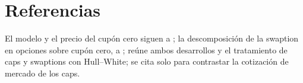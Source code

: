 \section{Referencias}\label{sec:cap05-referencias}

El modelo y el precio del cupón cero siguen a \citet{hull1990}; la descomposición de la swaption en opciones
sobre cupón cero, a \citet{jamshidian1989}; \citet{brigo2006} reúne ambos desarrollos y el tratamiento de caps y
swaptions con Hull--White; \citet{black1976} se cita solo para contrastar la cotización de mercado de los caps.
